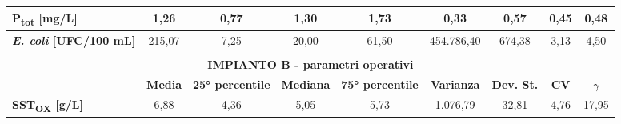 \begin{sidewaystable}[h]
\begin{center}
\begin{tabular}{lcccccccc}
		\multicolumn{1}{|l|}{\textbf{P\textsubscript{tot} {[}mg/L{]}}}          & \multicolumn{1}{c|}{1,26}           & \multicolumn{1}{c|}{0,77}                    & \multicolumn{1}{c|}{1,30}             & \multicolumn{1}{c|}{1,73}                    & \multicolumn{1}{c|}{0,33}              & \multicolumn{1}{c|}{0,57}              & \multicolumn{1}{c|}{0,45}        & \multicolumn{1}{c|}{0,48}           \\ \hline
		\multicolumn{1}{|l|}{\textbf{\textit{E. coli} {[}UFC/100 mL{]}}} & \multicolumn{1}{c|}{215,07}         & \multicolumn{1}{c|}{7,25}                    & \multicolumn{1}{c|}{20,00}            & \multicolumn{1}{c|}{61,50}                   & \multicolumn{1}{c|}{454.786,40}         & \multicolumn{1}{c|}{674,38}            & \multicolumn{1}{c|}{3,13}        & \multicolumn{1}{c|}{4,50}           \\ \hline
		\multicolumn{9}{l}{}                                                                                                                                                                                                                                                                                                                                                                           \\ \hline
		\multicolumn{9}{|c|}{\textbf{IMPIANTO B - parametri operativi}}                                                                                                                                                                                                                                                                                                                                \\ \hline
		\multicolumn{1}{l|}{}                                   & \multicolumn{1}{c|}{\textbf{Media}} & \multicolumn{1}{c|}{\textbf{25° percentile}} & \multicolumn{1}{c|}{\textbf{Mediana}} & \multicolumn{1}{c|}{\textbf{75° percentile}} & \multicolumn{1}{c|}{\textbf{Varianza}} & \multicolumn{1}{c|}{\textbf{Dev. St.}} & \multicolumn{1}{c|}{\textbf{CV}} & \multicolumn{1}{c|}{\textbf{$\gamma$}} \\ \hline
		\multicolumn{1}{|l|}{\textbf{SST\textsubscript{OX} {[}g/L{]}}}          & \multicolumn{1}{c|}{6,88}           & \multicolumn{1}{c|}{4,36}                    & \multicolumn{1}{c|}{5,05}             & \multicolumn{1}{c|}{5,73}                    & \multicolumn{1}{c|}{1.076,79}          & \multicolumn{1}{c|}{32,81}             & \multicolumn{1}{c|}{4,76}        & \multicolumn{1}{c|}{17,95}          \\ \hline

\end{tabular}
\end{center}
\end{sidewaystable}
